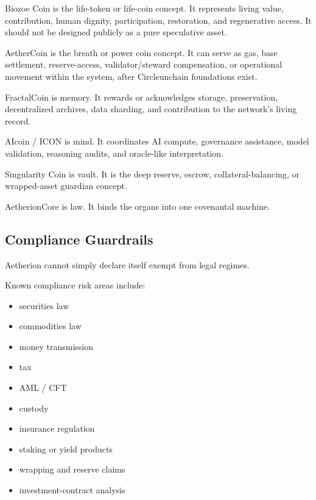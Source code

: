 ﻿\documentclass[12pt]{article}
\begin{document}
Biozoe Coin is the life-token or life-coin concept. It represents living value, contribution, human dignity, participation, restoration, and regenerative access. It should not be designed publicly as a pure speculative asset.

AetherCoin is the breath or power coin concept. It can serve as gas, base settlement, reserve-access, validator/steward compensation, or operational movement within the system, after Circleunchain foundations exist.

FractalCoin is memory. It rewards or acknowledges storage, preservation, decentralized archives, data sharding, and contribution to the network's living record.

AIcoin / ICON is mind. It coordinates AI compute, governance assistance, model validation, reasoning audits, and oracle-like interpretation.

Singularity Coin is vault. It is the deep reserve, escrow, collateral-balancing, or wrapped-asset guardian concept.

AetherionCore is law. It binds the organs into one covenantal machine.

\subsection{Compliance Guardrails}


Aetherion cannot simply declare itself exempt from legal regimes.

Known compliance risk areas include:

\begin{itemize}
  \item securities law
\end{itemize}
\begin{itemize}
  \item commodities law
\end{itemize}
\begin{itemize}
  \item money transmission
\end{itemize}
\begin{itemize}
  \item tax
\end{itemize}
\begin{itemize}
  \item AML / CFT
\end{itemize}
\begin{itemize}
  \item custody
\end{itemize}
\begin{itemize}
  \item insurance regulation
\end{itemize}
\begin{itemize}
  \item staking or yield products
\end{itemize}
\begin{itemize}
  \item wrapping and reserve claims
\end{itemize}
\begin{itemize}
  \item investment-contract analysis
\end{itemize}
\end{document}
